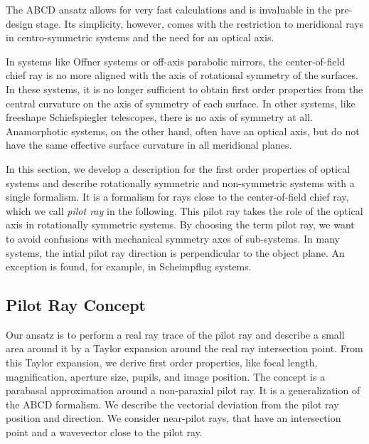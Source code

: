 \documentclass[12pt,a4paper,twoside,openright,BCOR10mm,headsepline,titlepage,abstracton,chapterprefix,final]{scrreprt}
\begin{document}
The ABCD ansatz allows for very fast calculations and is invaluable in the pre-design stage.
Its simplicity, however, comes with the restriction to meridional rays in centro-symmetric systems and the need for an optical axis.

In systems like Offner systems or off-axis parabolic mirrors, the center-of-field chief ray is no more aligned with the axis of rotational symmetry of the surfaces.
In these systems, it is no longer sufficient to obtain first order properties from the central curvature on the axis of symmetry of each surface.
In other systems, like freeshape Schiefspiegler telescopes, there is no axis of symmetry at all. 
Anamorphotic systems, on the other hand, often have an optical axis, but do not have the same effective surface curvature in all meridional planes.

In this section, we develop a description for the first order properties of optical systems 
and describe rotationally symmetric and non-symmetric systems with a single formalism.
It is a formalism for rays close to the center-of-field chief ray, which we call \emph{pilot ray} in the following.
This pilot ray takes the role of the optical axis in rotationally symmetric systems. 
By choosing the term pilot ray, we want to avoid confusions with mechanical symmetry axes of sub-systems.
In many systems, the intial pilot ray direction is perpendicular to the object plane. 
An exception is found, for example, in Scheimpflug systems.

\subsection{Pilot Ray Concept}
Our ansatz is to perform a real ray trace of the pilot ray and describe a small area around it by a Taylor expansion around the real ray intersection point.
From this Taylor expansion, we derive first order properties, like focal length, magnification, aperture size, pupils, and image position.
The concept is a parabasal approximation around a non-paraxial pilot ray.
It is a generalization of the ABCD formalism. 
We describe the vectorial deviation from the pilot ray position and direction.
We consider near-pilot rays, that have an intersection point and a wavevector close to the pilot ray.
\end{document}
